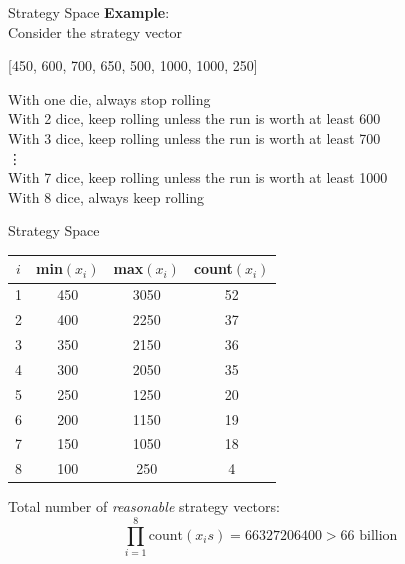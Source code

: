\documentclass{beamer}
\begin{document}
  \begin{frame}{Strategy Space}
  \textbf{Example}: \\
  Consider the strategy vector \\
  \smallskip
  \begin{center}
  [450, 600, 700, 650, 500, 1000, 1000, 250] \\
  \end{center}

  \medskip
  \hspace{5 pt} With one die, always stop rolling \\
  \hspace{5 pt} With 2 dice, keep rolling unless the run is worth at least 600 \\
  \hspace{5 pt} With 3 dice, keep rolling unless the run is worth at least 700 \\
  \hspace{100 pt}  \vdots \\
  \hspace{5 pt} With 7 dice, keep rolling unless the run is worth at least 1000 \\
  \hspace{5 pt} With 8 dice, always keep rolling
  \end{frame}
  
  \begin{frame}{Strategy Space}
\begin{table}[]
\centering
\begin{tabular}{|c|c|c|c|}
\hline
$i$ & min$(x_{i})$ & max$(x_{i})$ & count$(x_{i})$ \\ \hline
1 & 450       & 3050      & 52           \\ \hline
2 & 400       & 2250      & 37           \\ \hline
3 & 350       & 2150      & 36           \\ \hline
4 & 300       & 2050      & 35           \\ \hline
5 & 250       & 1250      & 20           \\ \hline
6 & 200       & 1150      & 19           \\ \hline
7 & 150       & 1050      & 18           \\ \hline
8 & 100       & 250       & 4            \\ \hline
\end{tabular}
\end{table}

Total number of \textit{reasonable} strategy vectors: 
$$\prod_{i=1}^{8} \text{count}(x_{i} s) = 66 327 206 400 > 66 \text{ billion}$$
  \end{frame}
\end{document}
